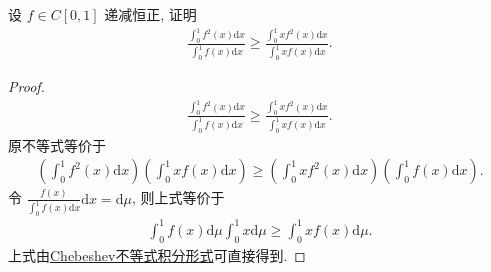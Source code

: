 \documentclass[../../main.tex]{subfiles}
\begin{document}
\begin{example}
设 $f \in C[0,1]$ 递减恒正, 证明
\begin{align*}
\frac{\int_0^1 f^2(x)\mathrm{d}x}{\int_0^1 f(x)\mathrm{d}x} \geqslant \frac{\int_0^1 xf^2(x)\mathrm{d}x}{\int_0^1 xf(x)\mathrm{d}x}.
\end{align*}
\end{example}
\begin{proof}
\begin{align*}
\frac{\int_0^1 f^2(x)\mathrm{d}x}{\int_0^1 f(x)\mathrm{d}x} \geqslant \frac{\int_0^1 xf^2(x)\mathrm{d}x}{\int_0^1 xf(x)\mathrm{d}x}.
\end{align*}
原不等式等价于
\begin{align*}
\left(\int_0^1 f^2(x)\mathrm{d}x\right)\left(\int_0^1 xf(x)\mathrm{d}x\right) \geqslant \left(\int_0^1 xf^2(x)\mathrm{d}x\right)\left(\int_0^1 f(x)\mathrm{d}x\right).
\end{align*}
令 $\frac{f(x)}{\int_0^1 f(x)\mathrm{d}x}\mathrm{d}x = \mathrm{d}\mu$, 则上式等价于
\begin{align*}
\int_0^1 f(x)\mathrm{d}\mu \int_0^1 x\mathrm{d}\mu \geqslant \int_0^1 xf(x)\mathrm{d}\mu.
\end{align*}
上式由\hyperref[Chebeshev不等式积分形式]{Chebeshev不等式积分形式}可直接得到. 

\end{proof}
\end{document}
